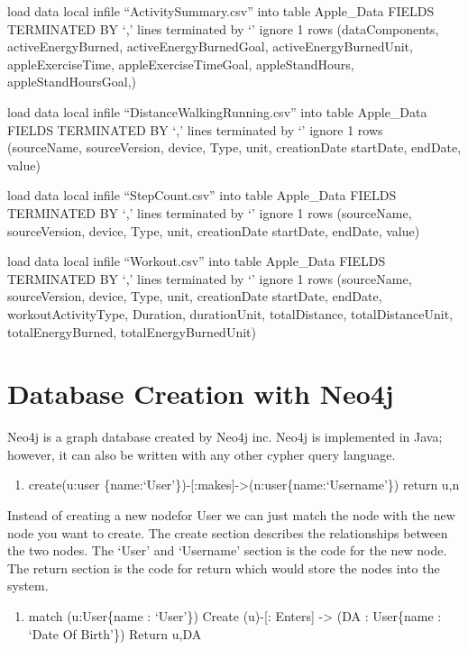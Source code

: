 \documentclass[]{book}
\providecommand{\tightlist}{%
  \setlength{\itemsep}{0pt}\setlength{\parskip}{0pt}}
\begin{document}
load data local infile ``ActivitySummary.csv'' into table Apple\_Data
FIELDS TERMINATED BY `,'
lines terminated by `\n'
ignore 1 rows
(dataComponents,
activeEnergyBurned, activeEnergyBurnedGoal,
activeEnergyBurnedUnit,
appleExerciseTime,
appleExerciseTimeGoal,
appleStandHours,
appleStandHoursGoal,)

load data local infile ``DistanceWalkingRunning.csv'' into table Apple\_Data
FIELDS TERMINATED BY `,'
lines terminated by `\n'
ignore 1 rows
(sourceName,
sourceVersion, device,
Type,
unit,
creationDate
startDate,
endDate,
value)

load data local infile
``StepCount.csv'' into table Apple\_Data
FIELDS TERMINATED BY `,'
lines terminated by `\n'
ignore 1 rows
(sourceName,
sourceVersion, device,
Type,
unit,
creationDate
startDate,
endDate,
value)

load data local infile
``Workout.csv'' into table Apple\_Data
FIELDS TERMINATED BY `,'
lines terminated by `\n'
ignore 1 rows
(sourceName,
sourceVersion, device,
Type,
unit,
creationDate
startDate,
endDate,
workoutActivityType,
Duration,
durationUnit,
totalDistance,
totalDistanceUnit,
totalEnergyBurned,
totalEnergyBurnedUnit)

\hypertarget{database-creation-with-neo4j}{%
\section{Database Creation with Neo4j}\label{database-creation-with-neo4j}}

Neo4j is a graph database created by Neo4j inc. Neo4j is implemented in Java; however, it
can also be written with any other cypher query language.

\begin{enumerate}
\def\labelenumi{\arabic{enumi}.}
\tightlist
\item
  create(u:user \{name:`User'\})-{[}:makes{]}-\textgreater{}(n:user\{name:`Username'\})
  return u,n
\end{enumerate}

Instead of creating a new nodefor User we can just match the node with the new node you want to create. The create section describes the relationships between the two nodes. The `User' and `Username' section is the code for the new node. The return section is the
code for return which would store the nodes into the system.

\begin{enumerate}
\def\labelenumi{\arabic{enumi}.}
\setcounter{enumi}{1}
\tightlist
\item
  match (u:User\{name : `User'\}) Create (u)-{[}: Enters{]} -\textgreater{} (DA : User\{name : `Date Of Birth'\})
  Return u,DA
\end{enumerate}
\end{document}
